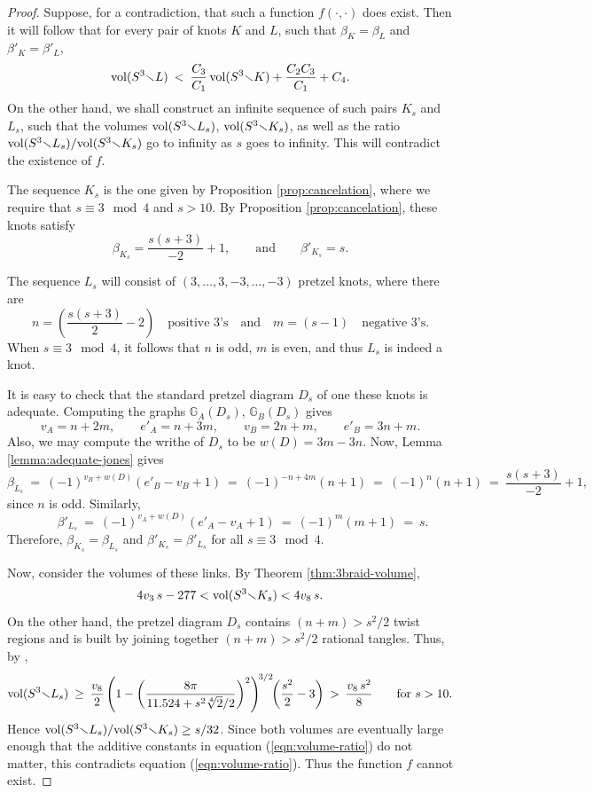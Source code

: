 \documentclass[11pt]{amsart}
\renewcommand{\setminus}{{\smallsetminus}}
\newcommand{\vol}{{\rm vol}}
\newcommand{\GA}{{\mathbb{G}_A}}
\newcommand{\GB}{{\mathbb{G}_B}}
\theoremstyle{plain}
\theoremstyle{definition}
\begin{document}
\begin{proof}
Suppose, for a contradiction, that such a function $f(\cdot, \cdot)$
does exist. Then it will follow that for every pair of knots $K$ and
$L$, such that $\beta_K = \beta_L$ and $\beta'_K = \beta'_L$,
\begin{equation}\label{eqn:volume-ratio}
\vol(S^3 \setminus L) \: < \: \frac{C_3}{C_1} \, \vol(S^3 \setminus K)
+ \frac{C_2 C_3}{C_1} + C_4 .
\end{equation}
On the other hand, we shall construct an infinite sequence of such
pairs $K_s$ and $L_s$, such that the volumes
$\vol(S^3 \setminus
L_s)$,  $\vol(S^3 \setminus K_s)$, as well as the ratio 
$\vol(S^3 \setminus
L_s) / \vol(S^3 \setminus K_s)$ go to infinity as $s$ goes to infinity. This will contradict
the existence of $f$.

The sequence $K_s$ is the one given by Proposition
\ref{prop:cancelation}, where we require that $s \equiv 3 \mod 4$ and
$s >10$.  By Proposition \ref{prop:cancelation}, these knots
satisfy
$$\beta_{K_s} = \frac{s(s+3)}{-2} + 1 , \qquad \mbox{and} \qquad
\beta'_{K_s} = s.$$

The sequence $L_s$ will consist of $(3, \ldots, 3, -3, \ldots, -3)$
pretzel knots, where there are
$$n = \left( \frac{s(s+3)}{2} - 2 \right) \quad \mbox{positive 3's} \quad \mbox{and}
\quad m = \left( s-1 \right) \quad \mbox{negative 3's}. $$
%
When $s \equiv 3 \mod 4$, it follows that $n$ is odd, $m$ is even, and
thus $L_s$ is indeed a knot.

It is easy to check that the standard pretzel diagram $D_s$ of one
these knots is adequate. Computing the graphs $\GA(D_s)$, $\GB(D_s)$
gives
$$v_A = n+2m, \qquad e'_A = n+3m, \qquad v_B = 2n+m, \qquad e'_B =
3n+m.$$
Also, we may compute the writhe of $D_s$ to be $w(D) = 3m-3n$.  Now,
Lemma \ref{lemma:adequate-jones} gives
$$\beta_{L_s}  \:=\: (-1)^{v_B + w(D)} (e'_B - v_B + 1) 
\:=\: (-1)^{-n + 4m} (n+1)
\:=\: (-1)^n(n+1) \:=\: \frac{s(s+3)}{-2} + 1,$$
%
since $n$ is odd. Similarly,
$$\qquad \beta'_{L_s} \:=\: (-1)^{v_A + w(D)} (e'_A - v_A + 1) \:=\:
(-1)^m(m+1) \:=\: s.$$
%
Therefore, $\beta_{K_s} = \beta_{L_s}$ and $\beta'_{K_s} =
\beta'_{L_s}$ for all $s \equiv 3 \mod 4$.

Now, consider the volumes of these links. By Theorem
\ref{thm:3braid-volume},
$$4v_3\,s -277 < \vol(S^3 \setminus K_s) < 4 v_8 \, s.$$
%
On the other hand, the pretzel diagram $D_s$ contains $(n+m) > s^2/2$
twist regions and is built by joining together $(n+m) > s^2/2$ rational
tangles. Thus, by \cite[Theorem 1.5]{fkp:conway},
$$\vol(S^3 \setminus L_s) \: \geq \: \frac{v_8}{2} \left(1 - \left(
\frac{8\pi}{11.524 + s^2 \sqrt[4]{2} /2 } \right)^2 \right)^{\!3/2}
\!\! \left(\frac{s^2}{2} -3\right) \: > \: \frac{v_8 \, s^2}{8} \qquad
\mbox{for } s >10.
$$
%
Hence $\vol(S^3 \setminus L_s) / \vol(S^3 \setminus K_s) \geq s/32$.
Since both volumes are eventually large enough that the additive
constants in equation (\ref{eqn:volume-ratio}) do not matter, this
contradicts equation (\ref{eqn:volume-ratio}).  Thus the function $f$
cannot exist.
\end{proof}





\end{document}

